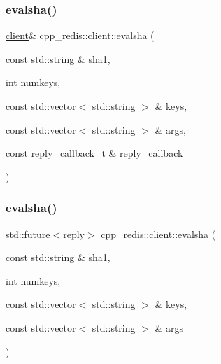 \mbox{\label{classcpp__redis_1_1client_a71cd73130b4755c9f4da3b602b09a1be}} 
\subsubsection{\texorpdfstring{evalsha()}{evalsha()}\hspace{0.1cm}{\footnotesize\ttfamily [1/2]}}
{\footnotesize\ttfamily \hyperlink{classcpp__redis_1_1client}{client}\& cpp\+\_\+redis\+::client\+::evalsha (\begin{DoxyParamCaption}\item[{const std\+::string \&}]{sha1,  }\item[{int}]{numkeys,  }\item[{const std\+::vector$<$ std\+::string $>$ \&}]{keys,  }\item[{const std\+::vector$<$ std\+::string $>$ \&}]{args,  }\item[{const \hyperlink{classcpp__redis_1_1client_a061a1140d36d2eaeda82b09a0bb3f9f2}{reply\+\_\+callback\+\_\+t} \&}]{reply\+\_\+callback }\end{DoxyParamCaption})}

\mbox{\label{classcpp__redis_1_1client_a3ab7684f292037dc3918c32549b7ad53}} 
\subsubsection{\texorpdfstring{evalsha()}{evalsha()}\hspace{0.1cm}{\footnotesize\ttfamily [2/2]}}
{\footnotesize\ttfamily std\+::future$<$\hyperlink{classcpp__redis_1_1reply}{reply}$>$ cpp\+\_\+redis\+::client\+::evalsha (\begin{DoxyParamCaption}\item[{const std\+::string \&}]{sha1,  }\item[{int}]{numkeys,  }\item[{const std\+::vector$<$ std\+::string $>$ \&}]{keys,  }\item[{const std\+::vector$<$ std\+::string $>$ \&}]{args }\end{DoxyParamCaption})}

